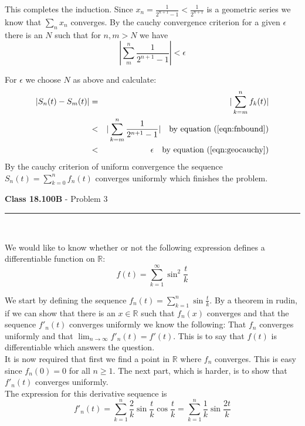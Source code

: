 \documentclass[11pt,reqno]{article}
\begin{document}
This completes the induction.
Since $x_n = \frac{1}{2^{n+1}-1} < \frac{1}{2^{n+1}}$ is a geometric series we know that $\sum_n x_n$ converges. By the cauchy convergence criterion for a given $\epsilon$ there is an $N$ such that for $n,m > N$ we have 
\begin{equation}
|\sum_m^n  \frac{1}{2^{n+1}-1} | < \epsilon \label{eqn:geocauchy}
\end{equation}

\noindent For $\epsilon$ we choose $N$ as above and calculate:
\begin{eqnarray*}
|S_n(t)-S_m(t)| &=& |\sum_{k=m}^n f_k(t)| \\
		         &<& |\sum_{k=m}^n \frac{1}{2^{n+1}-1}| \quad \text{by equation ($\ref{eqn:fnbound}$)} \\
		         &<& \epsilon  \quad \text{by equation ($\ref{eqn:geocauchy}$)} \\
\end{eqnarray*}
By the cauchy criterion of uniform convergence the sequence $S_n(t) = \sum_{k=0}^n f_n(t)$ converges uniformly which finishes the problem.

\vspace{15pt}
\begin{flushleft} 
\textbf{Class 18.100B} - Problem 3\\
\rule{500pt}{1pt}\\
\end{flushleft} 
 
 We would like to know whether or not the following expression defines a differentiable function on $\mathbb{R}$:
 \begin{equation}
 f(t) = \sum_{k=1}^\infty \sin^2 \frac{t}{k} \nonumber
 \end{equation}
 
 We start by defining the sequence $f_n(t) = \sum_{k = 1}^n \sin \frac{t}{k}$.  By a theorem in rudin, if we can show that there is an $x \in \mathbb{R}$ such that $f_n(x)$ converges and that the sequence $f'_n(t)$ converges uniformly we know the following: That $f_n$ converges uniformly and that $\lim_{n \to \infty} f'_n(t) = f'(t)$. This is to say that $f(t)$ is differentiable which answers the question.\\
\indent It is now required that first we find a point in $\mathbb{R}$ where $f_n$ converges. This is easy since $f_n(0) = 0$ for all $n \ge 1$. The next part, which is harder, is to show that $f'_n(t)$ converges uniformly. \\
 \indent The expression for this derivative sequence is
 \begin{equation}
  f'_n(t) = \sum_{k=1}^n \frac{2}{k} \sin \frac{t}{k} \cos \frac{t}{k} = \sum_{k=1}^n \frac{1}{k} \sin \frac{2t}{k} \nonumber
 \end{equation}
 
\end{document}
